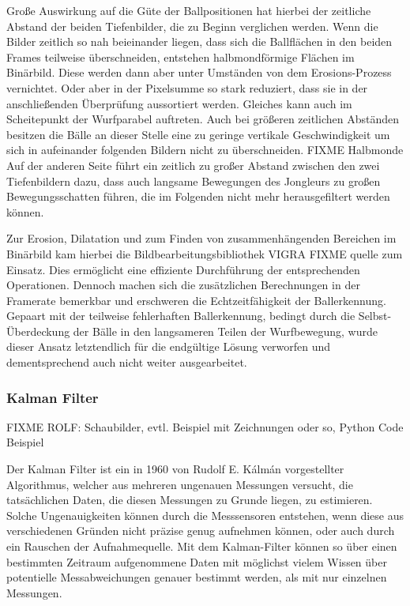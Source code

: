\documentclass[12pt,a4paper,ngerman]{scrartcl}
\begin{document}
Große Auswirkung auf die Güte der Ballpositionen hat hierbei der zeitliche Abstand der beiden Tiefenbilder, die zu Beginn verglichen werden. Wenn die Bilder zeitlich so nah beieinander liegen, dass sich die Ballflächen in den beiden Frames teilweise überschneiden, entstehen halbmondförmige Flächen im Binärbild.
Diese werden dann aber unter Umständen von dem Erosions-Prozess vernichtet.
Oder aber in der Pixelsumme so stark reduziert, dass sie in der anschließenden Überprüfung aussortiert werden.
Gleiches kann auch im Scheitepunkt der Wurfparabel auftreten. Auch bei größeren zeitlichen Abständen besitzen die Bälle an dieser Stelle eine zu geringe vertikale Geschwindigkeit um sich in aufeinander folgenden Bildern nicht zu überschneiden.
{\color{red}FIXME Halbmonde}
Auf der anderen Seite führt ein zeitlich zu großer Abstand zwischen den zwei Tiefenbildern dazu, dass auch langsame Bewegungen des Jongleurs zu großen Bewegungsschatten führen, die im Folgenden nicht mehr herausgefiltert werden können.

Zur Erosion, Dilatation und zum Finden von zusammenhängenden Bereichen im Binärbild kam hierbei die Bildbearbeitungsbibliothek VIGRA {\color{red}FIXME quelle} zum Einsatz.
Dies ermöglicht eine effiziente Durchführung der entsprechenden Operationen.
Dennoch machen sich die zusätzlichen Berechnungen in der Framerate bemerkbar und erschweren die Echtzeitfähigkeit der Ballerkennung. Gepaart mit der teilweise fehlerhaften Ballerkennung,
bedingt durch die Selbst-Überdeckung der Bälle in den langsameren Teilen der Wurfbewegung, wurde dieser Ansatz letztendlich für die endgültige Lösung verworfen und dementsprechend auch nicht weiter ausgearbeitet.

\subsubsection{Kalman Filter}

{\color{red} FIXME ROLF: Schaubilder, evtl. Beispiel mit Zeichnungen oder so, Python Code Beispiel}

Der Kalman Filter ist ein in 1960 von Rudolf E. Kálmán vorgestellter Algorithmus, welcher aus mehreren ungenauen Messungen versucht, die tatsächlichen Daten, die diesen Messungen zu Grunde liegen, zu estimieren.\cite{kalman} Solche Ungenauigkeiten können durch die Messsensoren entstehen, wenn diese aus verschiedenen Gründen nicht präzise genug aufnehmen können, oder auch durch ein Rauschen der Aufnahmequelle. Mit dem Kalman-Filter können so über einen bestimmten Zeitraum aufgenommene Daten mit möglichst vielem Wissen über potentielle Messabweichungen genauer bestimmt werden, als mit nur einzelnen Messungen.
\end{document}
